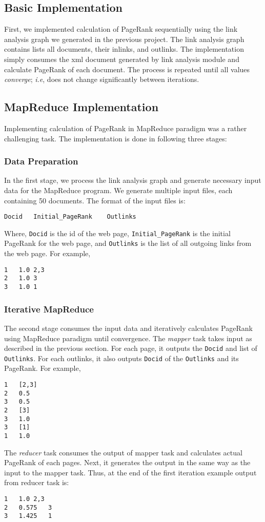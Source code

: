 \documentclass[letterpaper,11pt,twoside]{article}
\begin{document}
\subsection{Basic Implementation}
First, we implemented calculation of PageRank sequentially using the link analysis graph we generated in the previous project. The link analysis graph contains lists all documents, their inlinks, and outlinks. The implementation simply consumes the xml document generated by link analysis module and calculate PageRank of each document. The process is repeated until all values \emph{converge}; \emph{i.e}, does not change significantly between iterations.  

\subsection{MapReduce Implementation}
Implementing calculation of PageRank in MapReduce paradigm was a rather challenging task. The implementation is done in following three stages:
\subsubsection{Data Preparation}
In the first stage, we process the link analysis graph and generate necessary input data for the MapReduce program. We generate multiple input files, each containing 50 documents. The format of the input files is:
\begin{verbatim}
Docid	Initial_PageRank	Outlinks
\end{verbatim}

Where, \texttt{Docid} is the id of the web page, \texttt{Initial\_PageRank} is the initial PageRank for the web page, and \texttt{Outlinks} is the list of all outgoing links from the web page. For example,
\begin{verbatim}
1	1.0	2,3
2	1.0	3
3	1.0	1
\end{verbatim}

\subsubsection{Iterative MapReduce}
The second stage consumes the input data and iteratively calculates PageRank using MapReduce paradigm until convergence. The \emph{mapper} task takes input as described in the previous section. For each page, it outputs the \texttt{Docid} and list of \texttt{Outlinks}. For each outlinks, it also outputs \texttt{Docid} of the \texttt{Outlinks} and its PageRank. For example,
\begin{verbatim}
1	[2,3]
2	0.5
3	0.5
2	[3]
3	1.0
3	[1]
1	1.0
\end{verbatim}
The \emph{reducer} task consumes the output of mapper task and calculates actual PageRank of each pages. Next, it generates the output in the same way as the input to the mapper task. Thus, at the end of the first iteration example output from reducer task is:
\begin{verbatim}
1	1.0	2,3
2	0.575	3
3	1.425	1
\end{verbatim}
\end{document}
